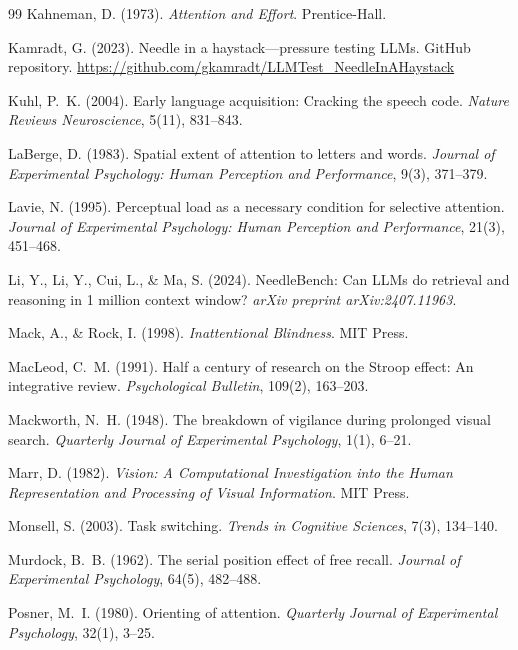 \documentclass{article}
\begin{document}
\begin{thebibliography}{99}
Kahneman, D. (1973). \emph{Attention and Effort}. Prentice-Hall.

Kamradt, G. (2023). Needle in a haystack---pressure testing LLMs. GitHub repository. \url{https://github.com/gkamradt/LLMTest_NeedleInAHaystack}

Kuhl, P.~K. (2004). Early language acquisition: Cracking the speech code. \emph{Nature Reviews Neuroscience}, 5(11), 831--843.

LaBerge, D. (1983). Spatial extent of attention to letters and words. \emph{Journal of Experimental Psychology: Human Perception and Performance}, 9(3), 371--379.

Lavie, N. (1995). Perceptual load as a necessary condition for selective attention. \emph{Journal of Experimental Psychology: Human Perception and Performance}, 21(3), 451--468.

Li, Y., Li, Y., Cui, L., \& Ma, S. (2024). NeedleBench: Can LLMs do retrieval and reasoning in 1 million context window? \emph{arXiv preprint arXiv:2407.11963}.

Mack, A., \& Rock, I. (1998). \emph{Inattentional Blindness}. MIT Press.

MacLeod, C.~M. (1991). Half a century of research on the Stroop effect: An integrative review. \emph{Psychological Bulletin}, 109(2), 163--203.

Mackworth, N.~H. (1948). The breakdown of vigilance during prolonged visual search. \emph{Quarterly Journal of Experimental Psychology}, 1(1), 6--21.

Marr, D. (1982). \emph{Vision: A Computational Investigation into the Human Representation and Processing of Visual Information}. MIT Press.

Monsell, S. (2003). Task switching. \emph{Trends in Cognitive Sciences}, 7(3), 134--140.

Murdock, B.~B. (1962). The serial position effect of free recall. \emph{Journal of Experimental Psychology}, 64(5), 482--488.

Posner, M.~I. (1980). Orienting of attention. \emph{Quarterly Journal of Experimental Psychology}, 32(1), 3--25.


\end{thebibliography}
\end{document}
